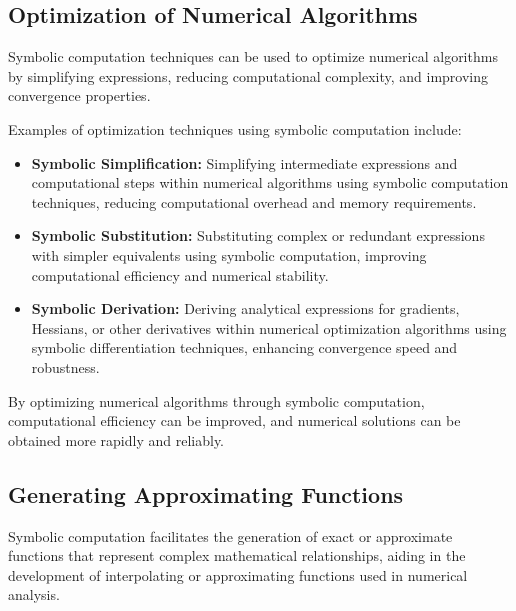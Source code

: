 \subsection{Optimization of Numerical Algorithms}

Symbolic computation techniques can be used to optimize numerical algorithms by simplifying expressions, reducing computational complexity, and improving convergence properties.

Examples of optimization techniques using symbolic computation include:
%
\begin{itemize}
  \item \textbf{Symbolic Simplification:} Simplifying intermediate expressions and computational steps within numerical algorithms using symbolic computation techniques, reducing computational overhead and memory requirements.
  \item \textbf{Symbolic Substitution:} Substituting complex or redundant expressions with simpler equivalents using symbolic computation, improving computational efficiency and numerical stability.
  \item \textbf{Symbolic Derivation:} Deriving analytical expressions for gradients, Hessians, or other derivatives within numerical optimization algorithms using symbolic differentiation techniques, enhancing convergence speed and robustness.
\end{itemize}
%
By optimizing numerical algorithms through symbolic computation, computational efficiency can be improved, and numerical solutions can be obtained more rapidly and reliably.

\subsection{Generating Approximating Functions}

Symbolic computation facilitates the generation of exact or approximate functions that represent complex mathematical relationships, aiding in the development of interpolating or approximating functions used in numerical analysis.

